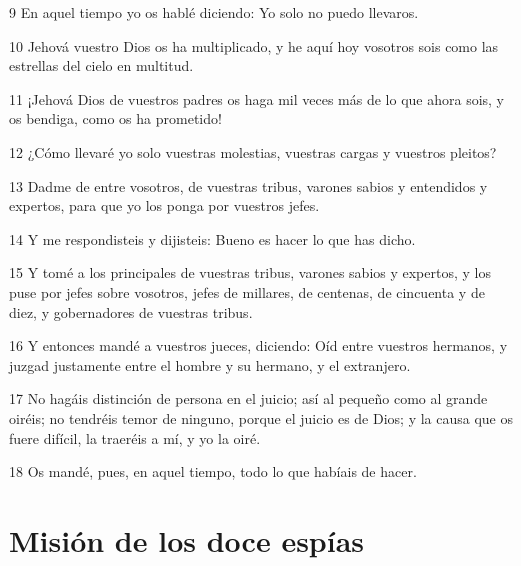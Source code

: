 \par 9 En aquel tiempo yo os hablé diciendo: Yo solo no puedo llevaros.
\par 10 Jehová vuestro Dios os ha multiplicado, y he aquí hoy vosotros sois como las estrellas del cielo en multitud.
\par 11 ¡Jehová Dios de vuestros padres os haga mil veces más de lo que ahora sois, y os bendiga, como os ha prometido!
\par 12 ¿Cómo llevaré yo solo vuestras molestias, vuestras cargas y vuestros pleitos?
\par 13 Dadme de entre vosotros, de vuestras tribus, varones sabios y entendidos y expertos, para que yo los ponga por vuestros jefes.
\par 14 Y me respondisteis y dijisteis: Bueno es hacer lo que has dicho.
\par 15 Y tomé a los principales de vuestras tribus, varones sabios y expertos, y los puse por jefes sobre vosotros, jefes de millares, de centenas, de cincuenta y de diez, y gobernadores de vuestras tribus.
\par 16 Y entonces mandé a vuestros jueces, diciendo: Oíd entre vuestros hermanos, y juzgad justamente entre el hombre y su hermano, y el extranjero.
\par 17 No hagáis distinción de persona en el juicio; así al pequeño como al grande oiréis; no tendréis temor de ninguno, porque el juicio es de Dios; y la causa que os fuere difícil, la traeréis a mí, y yo la oiré.
\par 18 Os mandé, pues, en aquel tiempo, todo lo que habíais de hacer.

\section{Misión de los doce espías }

